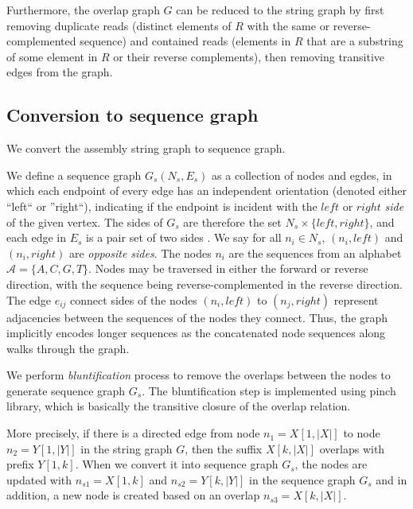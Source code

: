Furthermore, the overlap graph $G$ can be reduced to the string graph by first removing duplicate reads (distinct elements of $R$ with the same or reverse-complemented sequence) and contained reads (elements in $R$ that are a substring of some element in $R$ or their reverse complements), then removing transitive edges from the graph.


\subsection{Conversion to sequence graph} We convert the assembly string graph to sequence graph.
\begin{definition}
We define a sequence graph $G_s (N_s, E_s)$ as a collection of nodes and egdes, in which each endpoint of every edge has an independent orientation (denoted either ``left`` or ''right``),  
indicating if the endpoint is incident with the $left$ or $right$ \emph{side} of the given vertex. 
The sides of $G_s$ are therefore the set $N_s \times \{ left, right \}$, and each edge in $E_s$ is  a pair set of two sides .
We say for all $n_i \in N_s$, $(n_i, left)$ and $(n_i, right)$ are \emph{opposite sides}.
The nodes $n_i$ are the sequences from an alphabet $\mathcal{A} = \{A,C,G,T\}$. Nodes may be traversed in either the forward or reverse direction, with the sequence being reverse-complemented in the reverse direction. 
The edge $e_{ij}$ connect sides of the nodes $(n_i, left)$ to $(n_j, right)$ represent adjacencies between the sequences of the nodes they connect.
Thus, the graph implicitly encodes longer sequences as the concatenated node sequences along walks through the graph.
\end{definition}

We perform \textit{bluntification} process to remove the overlaps between the nodes to generate sequence graph $G_s$.
The bluntification step is implemented using pinch library, which is basically the transitive closure of the overlap relation.

More precisely, if there is a directed edge from node $n_1 = X[1,|X|]$ to node $n_2 = Y[1,|Y|]$ in the string graph $G$, then the suffix $X[k,|X|]$ overlaps with prefix $Y[1,k]$.
When we convert it into sequence graph $G_s$, the nodes are updated with $n_{s1} = X[1,k]$ and $n_{s2} = Y[k,|Y|]$ in the sequence graph $G_s$ and in addition, a new node is created based on an overlap $n_{s3} = X[k,|X|]$.   


